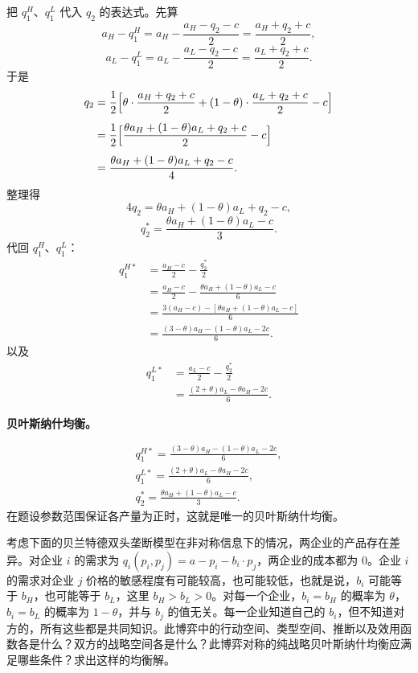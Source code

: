 把 $q_1^H$、$q_1^L$ 代入 $q_2$ 的表达式。先算
\[
	a_H-q_1^H=a_H-\frac{a_H-q_2-c}{2}=\frac{a_H+q_2+c}{2},
\]\indent
\[
	a_L-q_1^L=a_L-\frac{a_L-q_2-c}{2}=\frac{a_L+q_2+c}{2}.
\]\indent
于是
\[
\begin{aligned}
	q_2
	&=\frac{1}{2}\Bigl[\theta\cdot\frac{a_H+q_2+c}{2}
	+(1-\theta)\cdot\frac{a_L+q_2+c}{2}-c\Bigr]\\[4pt]
	&=\frac{1}{2}\Bigl[\frac{\theta a_H+(1-\theta)a_L+q_2+c}{2}-c\Bigr]\\[4pt]
	&=\frac{\theta a_H+(1-\theta)a_L+q_2-c}{4}.
\end{aligned}
\]\indent
整理得
\[
	4q_2=\theta a_H+(1-\theta)a_L+q_2-c,
\]\indent
\[
	q_2^*=\frac{\theta a_H+(1-\theta)a_L-c}{3}.
\]\indent
代回 $q_1^H$、$q_1^L$：
\[
\begin{aligned}
	q_1^{H*}
	&=\frac{a_H-c}{2}-\frac{q_2^*}{2}\\[4pt]
	&=\frac{a_H-c}{2}-\frac{\theta a_H+(1-\theta)a_L-c}{6}\\[4pt]
	&=\frac{3(a_H-c)-[\theta a_H+(1-\theta)a_L-c]}{6}\\[4pt]
	&=\frac{(3-\theta)a_H-(1-\theta)a_L-2c}{6}.
\end{aligned}
\]\indent
以及
\[
\begin{aligned}
	q_1^{L*}
	&=\frac{a_L-c}{2}-\frac{q_2^*}{2}\\[4pt]
	&=\frac{(2+\theta)a_L-\theta a_H-2c}{6}.
\end{aligned}
\]

\textbf{贝叶斯纳什均衡。}

\[
  \boxed{
    \begin{gathered}
      q_1^{H*}=\frac{(3-\theta)a_H-(1-\theta)a_L-2c}{6},\\[3pt]
      q_1^{L*}=\frac{(2+\theta)a_L-\theta a_H-2c}{6},\\[3pt]
      q_2^*=\frac{\theta a_H+(1-\theta)a_L-c}{3}.
    \end{gathered}
  }
\]\indent
在题设参数范围保证各产量为正时，这就是唯一的贝叶斯纳什均衡。


考虑下面的贝兰特德双头垄断模型在非对称信息下的情况，两企业的产品存在差异。对企业 $i$ 的需求为 $q_i(p_i,p_j)=a-p_i-b_i\cdot p_j$，两企业的成本都为 $0$。企业 $i$ 的需求对企业 $j$ 价格的敏感程度有可能较高，也可能较低，也就是说，$b_i$ 可能等于 $b_H$，也可能等于 $b_L$，这里 $b_H>b_L>0$。对每一个企业，$b_i=b_H$ 的概率为 $\theta$，$b_i=b_L$ 的概率为 $1-\theta$，并与 $b_j$ 的值无关。每一企业知道自己的 $b_i$，但不知道对方的，所有这些都是共同知识。此博弈中的行动空间、类型空间、推断以及效用函数各是什么？双方的战略空间各是什么？此博弈对称的纯战略贝叶斯纳什均衡应满足哪些条件？求出这样的均衡解。

